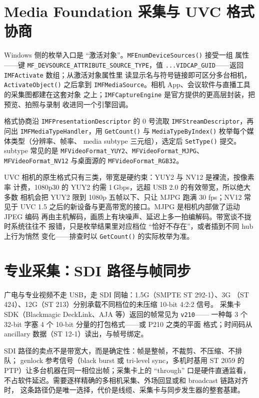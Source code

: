 \documentclass[12pt,a4paper,fontset=fandol]{ctexbook}
\newcommand{\Fn}[1]{\texttt{#1()}}
\newcommand{\Tp}[1]{\texttt{#1}}
\newcommand{\Bk}{\discretionary{}{}{}}
\begin{document}
\section{Media Foundation 采集与 UVC 格式协商}

Windows 侧的枚举入口是 ``激活对象''。\Fn{MFEnumDeviceSources} 接受一组
属性——键 \Tp{MF\_DEVSOURCE\_ATTRIBUTE\Bk\_SOURCE\_TYPE}，值
\Tp{...VIDCAP\_GUID\Bk}——返回 \Tp{IMFActivate} 数组；从激活对象属性里
读显示名与符号链接即可区分多台相机，\Fn{ActivateObject} 之后拿到
\Tp{IMFMediaSource}。相机 App、会议软件与直播工具的采集图都建在这套对象
之上；\Tp{IMFCaptureEngine} 是官方提供的更高层封装，把预览、拍照与录制
收进同一个引擎回调。

格式协商沿 \Tp{IMFPresentation{\Bk}Descriptor} 的 0 号流取
\Tp{IMFStream{\Bk}Descriptor}，再问出 \Tp{IMFMedia{\Bk}Type{\Bk}Handler}，用
\Fn{GetCount} 与 \Fn{Media{\Bk}Type{\Bk}By{\Bk}Index} 枚举每个媒体类型（分辨率、帧率、
media subtype 三元组），选定后 \Fn{SetType} 提交。subtype 常见的是
\Tp{MFVideo{\Bk}Format\_{\Bk}YUY2}、\Tp{MFVideo{\Bk}Format\_{\Bk}MJPG}、
\Tp{MFVideo{\Bk}Format\_{\Bk}NV12} 与桌面源的 \Tp{MFVideo{\Bk}Format\_{\Bk}RGB32}。

UVC 相机的原生格式只有三类，带宽是硬约束：YUY2 与 NV12 是裸流，按像素率
计费，1080p30 的 YUY2 约需 1\,Gbps，远超 USB 2.0 的有效带宽，所以绝大多数
相机会把 YUY2 限到 1080p 五帧以下、只让 MJPG 跑满 30 fps；NV12 常见于
UVC 1.5 之后的新设备与更高带宽的接口。MJPG 是相机内部做了运动 JPEG 编码
再由主机解码，画质上有块噪声、延迟上多一拍编解码。带宽谈不拢时系统往往不
报错，只是枚举结果里对应档位 ``恰好不存在''，或者插到不同 hub 上行为悄然
变化——排查时以 \Fn{GetCount} 的实际枚举为准。

\section{专业采集：SDI 路径与帧同步}

广电与专业视频不走 USB，走 SDI 同轴：1.5G（SMPTE ST 292-1）、3G
（ST 424）、12G（ST 213）分别承载不同档位的未压缩 10-bit 4:2:2 信号。
采集卡 SDK（Blackmagic DeckLink、AJA 等）返回的帧常见为 \Tp{v210}——
一种每 3 个 32-bit 字塞 4 个 10-bit 分量的打包格式——或 P210 之类的平面
格式；时间码从 ancillary 数据（ST 12-1）读出，与帧号绑定。

SDI 路径的卖点不是带宽大，而是确定性：帧是整帧，不裁剪、不压缩、不排队；
genlock 参考信号（black burst 或 tri-level sync，多机时基用 ST 2059 的
PTP）让多台机器在同一相位出帧；采集卡上的 ``through'' 口是硬件直通监看，
不占软件延迟。需要逐样精确的多相机采集、外场回显或和 broadcast 链路对齐时，
这条路径仍是唯一选择，代价是线缆、采集卡与同步发生器的整套基建。
\end{document}
